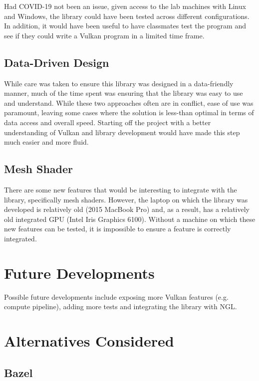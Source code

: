 \documentclass[12pt]{report}
\theoremstyle{definition}
\begin{document}
      Had COVID-19 not been an issue, given access to the lab machines with
      Linux and Windows, the library could have been tested across different
      configurations. In addition, it would have been useful to have
      classmates test the program and see if they could write a Vulkan
      program in a limited time frame.

    \subsection{Data-Driven Design}

      While care was taken to ensure this library was designed in a data-friendly
      manner, much of the time spent was ensuring that the library was easy to
      use and understand. While these two approaches often are in conflict, ease of
      use was paramount, leaving some cases where the solution is less-than
      optimal in terms of data access and overall speed. Starting off the
      project with a better understanding of Vulkan and library development
      would have made this step much easier and more fluid.

    \subsection{Mesh Shader}

      There are some new features that would be interesting to integrate with
      the library, specifically mesh shaders. However, the laptop on which
      the library was developed is relatively old (2015 MacBook Pro) and,
      as a result, has a relatively old integrated GPU (Intel Iris Graphics 6100).
      Without a machine on which these new features can be tested, it
      is impossible to ensure a feature is correctly integrated.

  \section{Future Developments}
    
    Possible future developments include exposing more Vulkan features
    (e.g. compute pipeline), adding more tests and integrating the library with
    NGL.

  \section{Alternatives Considered}

    \subsection{Bazel}
\end{document}
